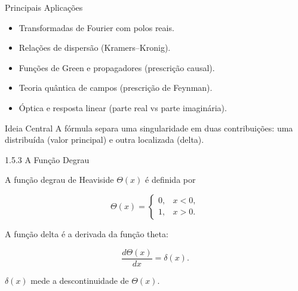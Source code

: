 \documentclass[aspectratio=169]{beamer}
\begin{document}
\begin{frame}
    
\begin{block}{Principais Aplicações}
\begin{itemize}
\item Transformadas de Fourier com polos reais.
\item Relações de dispersão (Kramers–Kronig).
\item Funções de Green e propagadores (prescrição causal).
\item Teoria quântica de campos (prescrição de Feynman).
\item Óptica e resposta linear (parte real vs parte imaginária).
\end{itemize}
\end{block}

\begin{alertblock}{Ideia Central}
A fórmula separa uma singularidade em duas contribuições:
uma distribuída (valor principal) e outra localizada (delta).
\end{alertblock}

\end{frame}


\begin{frame}{1.5.3 A Função Degrau}

A função degrau de Heaviside $\Theta(x)$ é definida por

\begin{equation}
\Theta(x)=
\begin{cases}
0, & x<0, \\
1, & x>0.
\end{cases}
\tag{1.107}
\end{equation}

\vspace{0.4cm}

A função delta é a derivada da função theta:

\begin{equation}
\frac{d\Theta(x)}{dx}=\delta(x).
\tag{1.108}
\end{equation}

\begin{tcolorbox}[colback=blue!5,colframe=blue]
$\delta(x)$ mede a descontinuidade de $\Theta(x)$.
\end{tcolorbox}

\end{frame}
\end{document}
